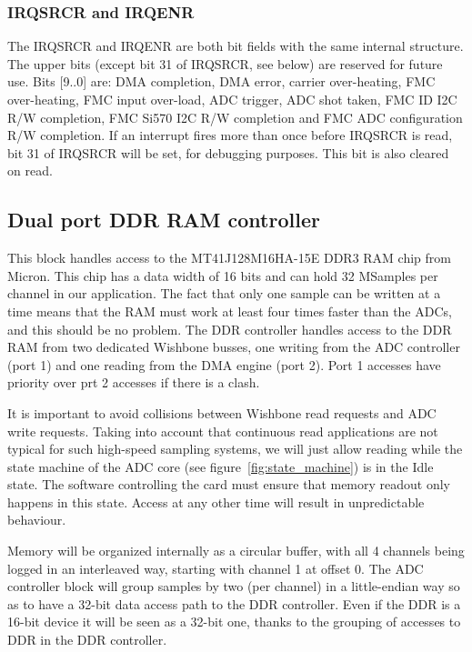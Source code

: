 \documentclass{article}
\begin{document}
\subsubsection{IRQSRCR and IRQENR}
The IRQSRCR and IRQENR are both bit fields with the same internal structure. The upper bits (except bit 31 of IRQSRCR, see below) are reserved for future use. Bits [9..0] are: DMA completion, DMA error, carrier over-heating, FMC over-heating, FMC input over-load, ADC trigger, ADC shot taken, FMC ID I2C R/W completion, FMC Si570 I2C R/W completion and FMC ADC configuration R/W completion. If an interrupt fires more than once before IRQSRCR is read, bit 31 of IRQSRCR will be set, for debugging purposes. This bit is also cleared on read.   

\subsection{Dual port DDR RAM controller}
This block handles access to the MT41J128M16HA-15E DDR3 RAM chip from Micron. This chip has a data width of 16 bits and can hold 32 MSamples per channel in our application. The fact that only one sample can be written at a time means that the RAM must work at least four times faster than the ADCs, and this should be no problem. The DDR controller handles access to the DDR RAM from two dedicated Wishbone busses, one writing from the ADC controller (port 1) and one reading from the DMA engine (port 2). Port 1 accesses have priority over prt 2 accesses if there is a clash.

It is important to avoid collisions between Wishbone read requests and ADC write requests. Taking into account that continuous read applications are not typical for such high-speed sampling systems, we will just allow reading while the state machine of the ADC core (see figure~\ref{fig:state_machine}) is in the Idle state. The software controlling the card must ensure that memory readout only happens in this state. Access at any other time will result in unpredictable behaviour. 

Memory will be organized internally as a circular buffer, with all 4 channels being logged in an interleaved way, starting with channel 1 at offset 0. The ADC controller block will group samples by two (per channel) in a little-endian way so as to have a 32-bit data access path to the DDR controller. Even if the DDR is a 16-bit device it will be seen as a 32-bit one, thanks to the grouping of accesses to DDR in the DDR controller.
\end{document}
